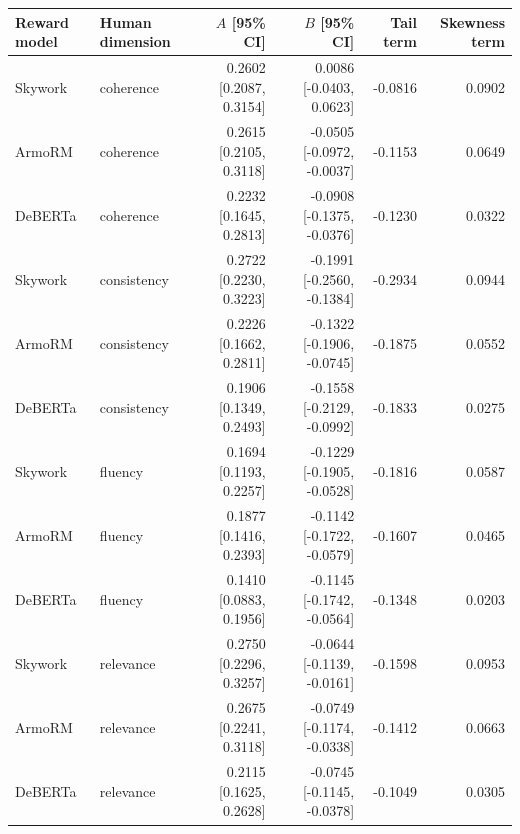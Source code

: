 \begin{tabular}{llrrrr}
\toprule
Reward model & Human dimension & $A$ [95\% CI] & $B$ [95\% CI] & Tail term & Skewness term \\
\midrule
Skywork & coherence & 0.2602 [0.2087, 0.3154] & 0.0086 [-0.0403, 0.0623] & -0.0816 & 0.0902 \\
ArmoRM & coherence & 0.2615 [0.2105, 0.3118] & -0.0505 [-0.0972, -0.0037] & -0.1153 & 0.0649 \\
DeBERTa & coherence & 0.2232 [0.1645, 0.2813] & -0.0908 [-0.1375, -0.0376] & -0.1230 & 0.0322 \\
Skywork & consistency & 0.2722 [0.2230, 0.3223] & -0.1991 [-0.2560, -0.1384] & -0.2934 & 0.0944 \\
ArmoRM & consistency & 0.2226 [0.1662, 0.2811] & -0.1322 [-0.1906, -0.0745] & -0.1875 & 0.0552 \\
DeBERTa & consistency & 0.1906 [0.1349, 0.2493] & -0.1558 [-0.2129, -0.0992] & -0.1833 & 0.0275 \\
Skywork & fluency & 0.1694 [0.1193, 0.2257] & -0.1229 [-0.1905, -0.0528] & -0.1816 & 0.0587 \\
ArmoRM & fluency & 0.1877 [0.1416, 0.2393] & -0.1142 [-0.1722, -0.0579] & -0.1607 & 0.0465 \\
DeBERTa & fluency & 0.1410 [0.0883, 0.1956] & -0.1145 [-0.1742, -0.0564] & -0.1348 & 0.0203 \\
Skywork & relevance & 0.2750 [0.2296, 0.3257] & -0.0644 [-0.1139, -0.0161] & -0.1598 & 0.0953 \\
ArmoRM & relevance & 0.2675 [0.2241, 0.3118] & -0.0749 [-0.1174, -0.0338] & -0.1412 & 0.0663 \\
DeBERTa & relevance & 0.2115 [0.1625, 0.2628] & -0.0745 [-0.1145, -0.0378] & -0.1049 & 0.0305 \\
\bottomrule
\end{tabular}
